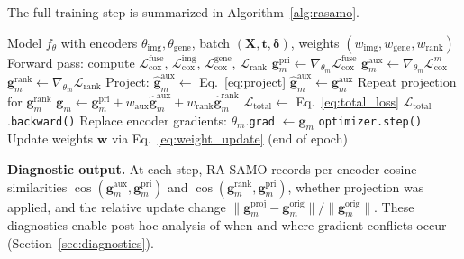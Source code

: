 \documentclass[10pt,twocolumn]{article}
\begin{document}
The full training step is summarized in Algorithm~\ref{alg:rasamo}.

\begin{algorithm}[t]
\caption{RA-SAMO Training Step}
\label{alg:rasamo}
\begin{algorithmic}[1]
\REQUIRE Model $f_\theta$ with encoders $\theta_{\text{img}}, \theta_{\text{gene}}$,
batch $(\mathbf{X}, \mathbf{t}, \boldsymbol{\delta})$,
weights $(w_{\text{img}}, w_{\text{gene}}, w_{\text{rank}})$
\STATE Forward pass: compute
$\mathcal{L}_{\text{cox}}^{\text{fuse}}$,
$\mathcal{L}_{\text{cox}}^{\text{img}}$,
$\mathcal{L}_{\text{cox}}^{\text{gene}}$,
$\mathcal{L}_{\text{rank}}$
  \STATE $\mathbf{g}_m^{\text{pri}} \leftarrow \nabla_{\theta_m} \mathcal{L}_{\text{cox}}^{\text{fuse}}$
  \STATE $\mathbf{g}_m^{\text{aux}} \leftarrow \nabla_{\theta_m} \mathcal{L}_{\text{cox}}^{m}$
  \STATE $\mathbf{g}_m^{\text{rank}} \leftarrow \nabla_{\theta_m} \mathcal{L}_{\text{rank}}$
    \STATE Project: $\hat{\mathbf{g}}_m^{\text{aux}} \leftarrow$ Eq.~\ref{eq:project}
  \ELSE
    \STATE $\hat{\mathbf{g}}_m^{\text{aux}} \leftarrow \mathbf{g}_m^{\text{aux}}$
  \ENDIF
  \STATE Repeat projection for $\mathbf{g}_m^{\text{rank}}$
  \STATE $\mathbf{g}_m \leftarrow \mathbf{g}_m^{\text{pri}} + w_{\text{aux}} \hat{\mathbf{g}}_m^{\text{aux}} + w_{\text{rank}} \hat{\mathbf{g}}_m^{\text{rank}}$
\ENDFOR
\STATE $\mathcal{L}_{\text{total}} \leftarrow$ Eq.~\ref{eq:total_loss}
\STATE $\mathcal{L}_{\text{total}}$.\texttt{backward()}
\STATE Replace encoder gradients: $\theta_m$.\texttt{grad} $\leftarrow \mathbf{g}_m$
\STATE \texttt{optimizer.step()}
\STATE Update weights $\mathbf{w}$ via Eq.~\ref{eq:weight_update} (end of epoch)
\end{algorithmic}
\end{algorithm}

\textbf{Diagnostic output.} At each step, RA-SAMO records
per-encoder cosine similarities
$\cos(\mathbf{g}_m^{\text{aux}}, \mathbf{g}_m^{\text{pri}})$ and
$\cos(\mathbf{g}_m^{\text{rank}}, \mathbf{g}_m^{\text{pri}})$,
whether projection was applied, and the relative update change
$\|\mathbf{g}_m^{\text{proj}} - \mathbf{g}_m^{\text{orig}}\| /
\|\mathbf{g}_m^{\text{orig}}\|$. These diagnostics enable
post-hoc analysis of when and where gradient conflicts occur
(Section~\ref{sec:diagnostics}).


\end{document}
